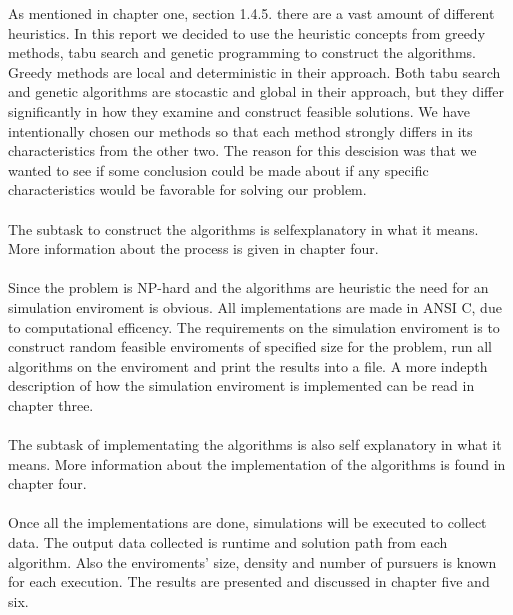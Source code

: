 As mentioned in chapter one, section 1.4.5. there are a vast amount of different heuristics. In this report we decided to use the heuristic concepts from greedy methods, tabu search and genetic programming to construct the algorithms. Greedy methods are local and deterministic in their approach. Both tabu search and genetic algorithms are stocastic and global in their approach, but they differ significantly in how they examine and construct feasible solutions. We have intentionally chosen our methods so that each method strongly differs in its characteristics from the other two. The reason for this descision was that we wanted to see if some conclusion could be made about if any specific characteristics would be favorable for solving our problem.\\
\\The subtask to construct the algorithms is selfexplanatory in what it means. More information about the process is given in chapter four.\\
\\Since the problem is NP-hard and the algorithms are heuristic the need for an simulation enviroment is obvious. All implementations are made in ANSI C, due to computational efficency. The requirements on the simulation enviroment is to construct random feasible enviroments of specified size for the problem, run all algorithms on the enviroment and print the results into a file. A more indepth description of how the simulation enviroment is implemented can be read in chapter three.\\
\\The subtask of implementating the algorithms is also self explanatory in what it means. More information about the implementation of the algorithms is found in chapter four.\\
\\Once all the implementations are done, simulations will be executed to collect data. The output data collected is runtime and solution path from each algorithm. Also the enviroments' size, density and number of pursuers is known for each execution. The results are presented and discussed in chapter five and six.
 